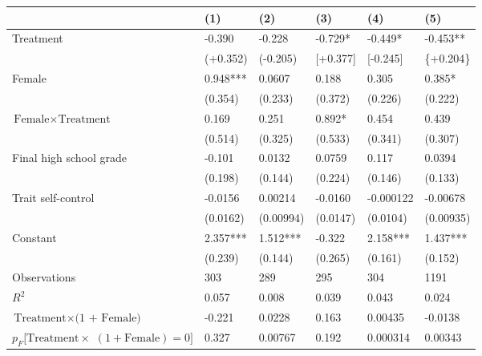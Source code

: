 \footnotesize
\newcolumntype{T}{S[table-format=+1.3, round-mode=places, round-precision=3, table-space-text-pre={**}, table-space-text-post={-**}, round-integer-to-decimal=false]}
\begin{tabularx}
	{\textwidth}
	{@{} L<{{\leavevmode\onslide<2->}} @{\hspace{1.5em}} T<{{\leavevmode\onslide<3->}} @{\hspace{1em}} T<{{\leavevmode\onslide<4->}} @{\hspace{1em}} T<{{\leavevmode\onslide<5->}} @{\hspace{1em}} T<{{\leavevmode\onslide<6>}} @{\hspace{1em}} T<{{\leavevmode\onslide}} @{}}
\toprule
&	{(1)}	&	{(2)}	&	{(3)}	&	{(4)}	&	{(5)} \\
\midrule
Treatment
	&	-0.390	&	-0.228	&	-0.729*	&	-0.449*	&	-0.453**	\\
	&	(+0.352)	&	(-0.205)	&	[+0.377]	&	[-0.245]	&	{\{}+0.204{\}}	\\
Female
	&	0.948***	&	0.0607	&	0.188	&	0.305	&	0.385*	\\
	&	(0.354)	&	(0.233)	&	(0.372)	&	(0.226)	&	(0.222)	\\
$\text{Female} \times \text{Treatment}$
	&	0.169	&	0.251	&	0.892*	&	0.454	&	0.439	\\
	&	(0.514)	&	(0.325)	&	(0.533)	&	(0.341)	&	(0.307)	\\
Final high school grade
	&	-0.101	&	0.0132	&	0.0759	&	0.117	&	0.0394	\\
	&	(0.198)	&	(0.144)	&	(0.224)	&	(0.146)	&	(0.133)	\\
Trait self-control
	&	-0.0156	&	0.00214	&	-0.0160	&	-0.000122	&	-0.00678	\\
	&	(0.0162)	&	(0.00994)	&	(0.0147)	&	(0.0104)	&	(0.00935)	\\
Constant
	&	2.357***	&	1.512***	&	-0.322	&	2.158***	&	1.437***	\\
	&	(0.239)	&	(0.144)	&	(0.265)	&	(0.161)	&	(0.152)	\\
\midrule
Observations
	&	{303}	&	{289}	&	{295}	&	{304}	&	{1191}	\\
$R^2$
	&	0.057	&	0.008	&	0.039	&	0.043	&	0.024	\\
\midrule
$\text{Treatment} \times \text{(1 + Female)}$
	&	-0.221	&	0.0228	&	0.163	&	0.00435	&	-0.0138	\\
$p_F[\text{Treatment} \times {}$ \newline\hspace{12pt}$(1 + \text{Female}) = 0]$
	&	0.327	&	0.00767	&	0.192	&	0.000314	&	0.00343	\\
\bottomrule
\end{tabularx}
